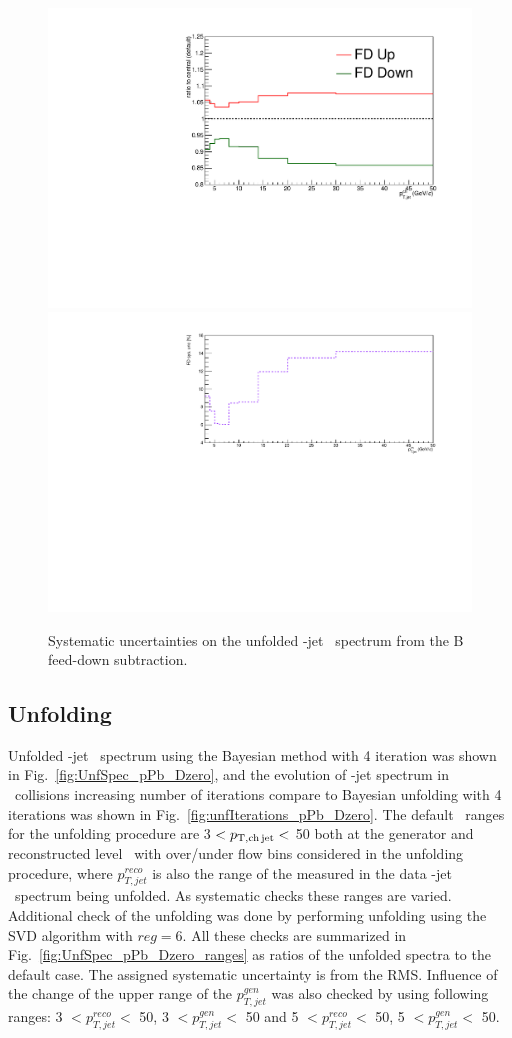 \begin{figure}[bth]
\begin{center}
\includegraphics[width=.45\textwidth]{pPbcuts_2sig/feed_down/bfeeddown_ratio}
\includegraphics[width=.45\textwidth]{pPbcuts_2sig/feed_down/bfeeddown_sys}
\caption{Systematic uncertainties on the unfolded \Dzero-jet \pt\ spectrum from the B feed-down subtraction.} 
\label{fig:BFeedDown_sysUnc_Dzero}
\end{center}
\end{figure}


\subsection{Unfolding}
\label{sUnfoldSys}

Unfolded \Dzero-jet \pt\ spectrum using the Bayesian method with 4 iteration was shown in Fig.~\ref{fig:UnfSpec_pPb_Dzero}, and the evolution of \Dzero-jet spectrum in \pp\ collisions increasing number of iterations compare to Bayesian unfolding with 4 iterations was shown in Fig.~\ref{fig:unfIterations_pPb_Dzero}. 
The default \ptchjet\ ranges for the unfolding procedure are 3 $< p_{\mathrm{T,ch\, jet}}< $ 50 both at the generator and reconstructed level \pt\, with over/under flow bins considered in the unfolding procedure, where $p_{T,jet}^{reco}$ is also the range of the measured in the data \Dzero-jet \pt\ spectrum being unfolded. 
As systematic checks these ranges are varied.
Additional check of the unfolding was done by performing unfolding using the SVD algorithm with $reg=6$.
All these checks are summarized in Fig.~\ref{fig:UnfSpec_pPb_Dzero_ranges} as ratios of the unfolded spectra to the default case. The assigned systematic uncertainty is from the RMS.
Influence of the change of the upper range of the $p_{T,jet}^{gen}$ was also checked by using following ranges: 3 $<  p_{T,jet}^{reco} < $ 50, 3 $<  p_{T,jet}^{gen} < $ 50 and 5 $<  p_{T,jet}^{reco} < $ 50, 5 $<  p_{T,jet}^{gen} < $ 50. 

